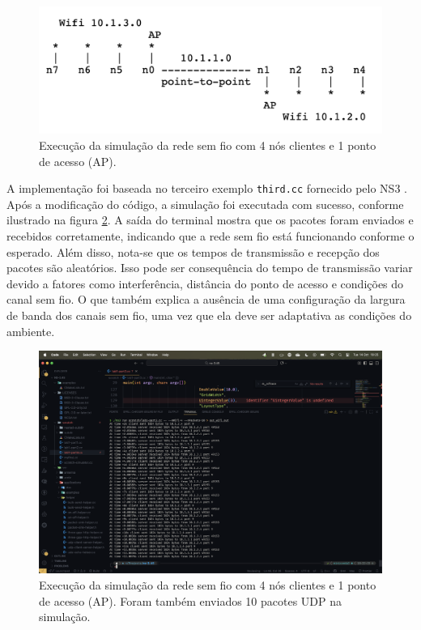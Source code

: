 \documentclass[12pt,a4paper]{article}
\begin{document}
\begin{figure}
  \centering
  \includegraphics[width=1\textwidth]{wireless_topology.png}
  \caption{Execução da simulação da rede sem fio com 4 nós clientes e 1 ponto de acesso (AP).}
  \label{fig:wireless_topology}
\end{figure}

A implementação foi baseada no terceiro exemplo \texttt{third.cc} fornecido pelo NS3 \cite{ns3_tutorial}. Após a modificação do código, a simulação foi executada com sucesso, conforme ilustrado na figura \ref{fig:wireless_simulation}. A saída do terminal mostra que os pacotes foram enviados e recebidos corretamente, indicando que a rede sem fio está funcionando conforme o esperado. Além disso, nota-se que os tempos de transmissão e recepção dos pacotes são aleatórios. Isso pode ser consequência do tempo de transmissão variar devido a fatores como interferência, distância do ponto de acesso e condições do canal sem fio. O que também explica a ausência de uma configuração da largura de banda dos canais sem fio, uma vez que ela deve ser adaptativa as condições do ambiente.

\begin{figure}
  \centering
  \includegraphics[width=1\textwidth]{run_wifi_4_10.png}
  \caption{Execução da simulação da rede sem fio com 4 nós clientes e 1 ponto de acesso (AP). Foram também enviados 10 pacotes UDP na simulação.}
  \label{fig:wireless_simulation}
\end{figure}
\end{document}
